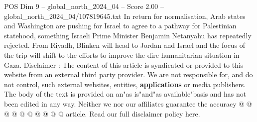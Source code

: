 \begin{textsample}{POS Dim 9 – global\_north\_2024\_04 – Score 2.00 – global\_north\_2024\_04/107819645.txt}
In return for normalisation, Arab states and Washington are pushing for Israel to agree to a pathway for Palestinian statehood, something Israeli Prime Minister Benjamin Netanyahu has repeatedly rejected.
From Riyadh, Blinken will head to Jordan and Israel and the focus of the trip will shift to the efforts to improve the dire humanitarian situation in Gaza.
Disclaimer : The content of this article is syndicated or provided to this website from an external third party provider.
We are not responsible for, and do not control, such external websites, entities, \textbf{applications} or media publishers.
The body of the text is provided on an"as is"and"as available"basis and has not been edited in any way.
Neither we nor our affiliates guarantee the accuracy @ @ @ @ @ @ @ @ @ @ article.
Read our full disclaimer policy here.

\end{textsample}
